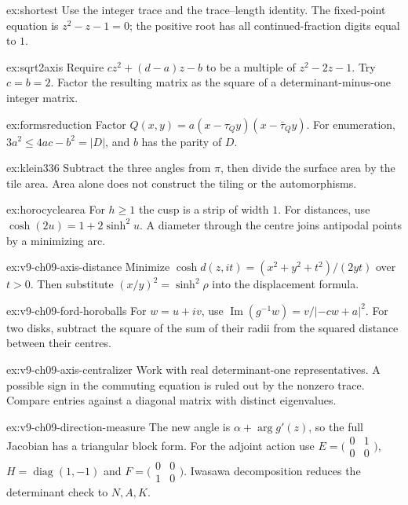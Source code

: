 \begin{hint}{ex:shortest}
Use the integer trace and the trace--length identity. The fixed-point equation is $z^2-z-1=0$; the positive root has all continued-fraction digits equal to $1$.
\end{hint}

\begin{hint}{ex:sqrt2axis}
Require $cz^2+(d-a)z-b$ to be a multiple of $z^2-2z-1$. Try $c=b=2$. Factor the resulting matrix as the square of a determinant-minus-one integer matrix.
\end{hint}

\begin{hint}{ex:formsreduction}
Factor $Q(x,y)=a(x-\tau_Qy)(x-\bar\tau_Qy)$. For enumeration, $3a^2\le4ac-b^2=|D|$, and $b$ has the parity of $D$.
\end{hint}

\begin{hint}{ex:klein336}
Subtract the three angles from $\pi$, then divide the surface area by the tile area. Area alone does not construct the tiling or the automorphisms.
\end{hint}

\begin{hint}{ex:horocyclearea}
For $h\ge1$ the cusp is a strip of width $1$. For distances, use $\cosh(2u)=1+2\sinh^2u$. A diameter through the centre joins antipodal points by a minimizing arc.
\end{hint}

\begin{hint}{ex:v9-ch09-axis-distance}
Minimize $\cosh d(z,it)=(x^2+y^2+t^2)/(2yt)$ over $t>0$. Then substitute $(x/y)^2=\sinh^2\rho$ into the displacement formula.
\end{hint}

\begin{hint}{ex:v9-ch09-ford-horoballs}
For $w=u+iv$, use $\operatorname{Im}(g^{-1}w)=v/|-cw+a|^2$. For two disks, subtract the square of the sum of their radii from the squared distance between their centres.
\end{hint}

\begin{hint}{ex:v9-ch09-axis-centralizer}
Work with real determinant-one representatives. A possible sign in the commuting equation is ruled out by the nonzero trace. Compare entries against a diagonal matrix with distinct eigenvalues.
\end{hint}

\begin{hint}{ex:v9-ch09-direction-measure}
The new angle is $\alpha+\arg g'(z)$, so the full Jacobian has a triangular block form. For the adjoint action use $E=\bigl(\begin{smallmatrix}0&1\\0&0\end{smallmatrix}\bigr)$, $H=\operatorname{diag}(1,-1)$ and $F=\bigl(\begin{smallmatrix}0&0\\1&0\end{smallmatrix}\bigr)$. Iwasawa decomposition reduces the determinant check to $N,A,K$.
\end{hint}

